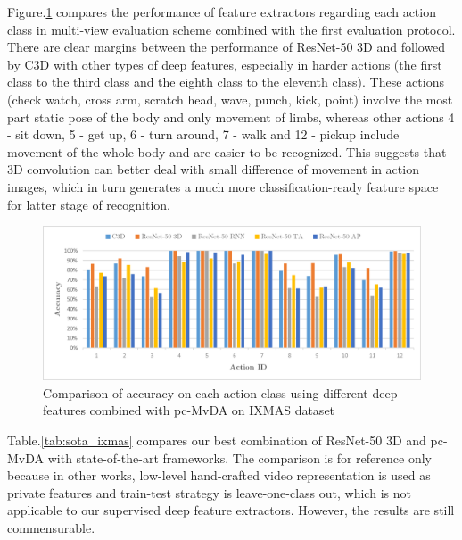     Figure.\ref{fig:pc-MvDA_confusion_ixmas} compares the performance of feature extractors regarding each action class in multi-view evaluation scheme combined with the first evaluation protocol. There are clear margins between the performance of ResNet-50 3D and followed by C3D with other types of deep features, especially in harder actions (the first class to the third class and the eighth class to the eleventh class). These actions (check watch, cross arm, scratch head, wave, punch, kick, point) involve the most part static pose of the body and only movement of limbs, whereas other actions 4 - sit down, 5 - get up, 6 - turn around, 7 - walk and 12 - pickup include movement of the whole body and are easier to be recognized. This suggests that 3D convolution can better deal with small difference of movement in action images, which in turn generates a much more classification-ready feature space for latter stage of recognition.

    \begin{figure}[htbp]
        \centering
        \includegraphics[width=0.8\linewidth]{figs/pc-MvDA_confusion_ixmas.png}
        \caption{Comparison of accuracy on each action class using different deep features combined with pc-MvDA on IXMAS dataset}
        \label{fig:pc-MvDA_confusion_ixmas}
    \end{figure}

    Table.\ref{tab:sota_ixmas} compares our best combination of ResNet-50 3D and pc-MvDA with state-of-the-art frameworks. The comparison is for reference only because in other works, low-level hand-crafted video representation is used as private features and train-test strategy is leave-one-class out, which is not applicable to our supervised deep feature extractors. However, the results are still commensurable. %

